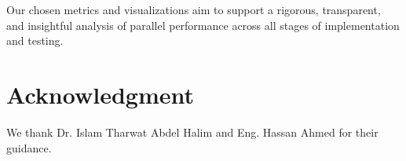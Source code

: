 \documentclass[conference, 10pt]{IEEEtran}
\begin{document}
Our chosen metrics and visualizations aim to support a rigorous, transparent, and insightful analysis of parallel performance across all stages of implementation and testing.











\section*{Acknowledgment} 
We thank Dr. Islam Tharwat Abdel Halim and Eng. Hassan Ahmed for their guidance.


 
\end{document}
